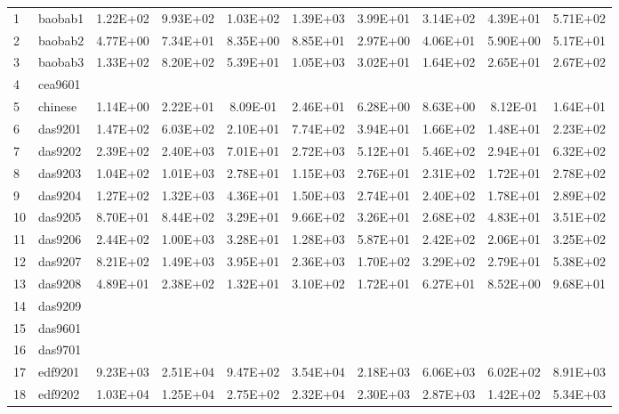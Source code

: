 \begin{landscape}
\begin{longtable}{@{}ll*{8}{S}@{}}
1  & baobab1   & 1.22E+02 & 9.93E+02 & 1.03E+02 & 1.39E+03 & 3.99E+01 & 3.14E+02 & 4.39E+01 & 5.71E+02 \\
2  & baobab2   & 4.77E+00 & 7.34E+01 & 8.35E+00 & 8.85E+01 & 2.97E+00 & 4.06E+01 & 5.90E+00 & 5.17E+01 \\
3  & baobab3   & 1.33E+02 & 8.20E+02 & 5.39E+01 & 1.05E+03 & 3.02E+01 & 1.64E+02 & 2.65E+01 & 2.67E+02 \\
4  & cea9601   &          &          &          &          &          &          &          &          \\
5  & chinese   & 1.14E+00 & 2.22E+01 & 8.09E-01 & 2.46E+01 & 6.28E+00 & 8.63E+00 & 8.12E-01 & 1.64E+01 \\
6  & das9201   & 1.47E+02 & 6.03E+02 & 2.10E+01 & 7.74E+02 & 3.94E+01 & 1.66E+02 & 1.48E+01 & 2.23E+02 \\
7  & das9202   & 2.39E+02 & 2.40E+03 & 7.01E+01 & 2.72E+03 & 5.12E+01 & 5.46E+02 & 2.94E+01 & 6.32E+02 \\
8  & das9203   & 1.04E+02 & 1.01E+03 & 2.78E+01 & 1.15E+03 & 2.76E+01 & 2.31E+02 & 1.72E+01 & 2.78E+02 \\
9  & das9204   & 1.27E+02 & 1.32E+03 & 4.36E+01 & 1.50E+03 & 2.74E+01 & 2.40E+02 & 1.78E+01 & 2.89E+02 \\
10 & das9205   & 8.70E+01 & 8.44E+02 & 3.29E+01 & 9.66E+02 & 3.26E+01 & 2.68E+02 & 4.83E+01 & 3.51E+02 \\
11 & das9206   & 2.44E+02 & 1.00E+03 & 3.28E+01 & 1.28E+03 & 5.87E+01 & 2.42E+02 & 2.06E+01 & 3.25E+02 \\
12 & das9207   & 8.21E+02 & 1.49E+03 & 3.95E+01 & 2.36E+03 & 1.70E+02 & 3.29E+02 & 2.79E+01 & 5.38E+02 \\
13 & das9208   & 4.89E+01 & 2.38E+02 & 1.32E+01 & 3.10E+02 & 1.72E+01 & 6.27E+01 & 8.52E+00 & 9.68E+01 \\
14 & das9209   &          &          &          &          &          &          &          &          \\
15 & das9601   &          &          &          &          &          &          &          &          \\
16 & das9701   &          &          &          &          &          &          &          &          \\
17 & edf9201   & 9.23E+03 & 2.51E+04 & 9.47E+02 & 3.54E+04 & 2.18E+03 & 6.06E+03 & 6.02E+02 & 8.91E+03 \\
18 & edf9202   & 1.03E+04 & 1.25E+04 & 2.75E+02 & 2.32E+04 & 2.30E+03 & 2.87E+03 & 1.42E+02 & 5.34E+03 \\

\end{longtable}
\end{landscape}
